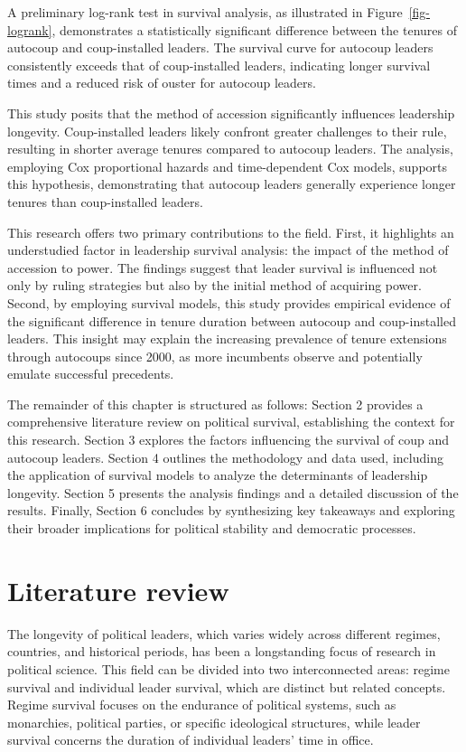 \documentclass[
  12pt,
]{report}
\begin{document}
A preliminary log-rank test in survival analysis, as illustrated in
Figure~\ref{fig-logrank}, demonstrates a statistically significant
difference between the tenures of autocoup and coup-installed leaders.
The survival curve for autocoup leaders consistently exceeds that of
coup-installed leaders, indicating longer survival times and a reduced
risk of ouster for autocoup leaders.

This study posits that the method of accession significantly influences
leadership longevity. Coup-installed leaders likely confront greater
challenges to their rule, resulting in shorter average tenures compared
to autocoup leaders. The analysis, employing Cox proportional hazards
and time-dependent Cox models, supports this hypothesis, demonstrating
that autocoup leaders generally experience longer tenures than
coup-installed leaders.

This research offers two primary contributions to the field. First, it
highlights an understudied factor in leadership survival analysis: the
impact of the method of accession to power. The findings suggest that
leader survival is influenced not only by ruling strategies but also by
the initial method of acquiring power. Second, by employing survival
models, this study provides empirical evidence of the significant
difference in tenure duration between autocoup and coup-installed
leaders. This insight may explain the increasing prevalence of tenure
extensions through autocoups since 2000, as more incumbents observe and
potentially emulate successful precedents.

The remainder of this chapter is structured as follows: Section 2
provides a comprehensive literature review on political survival,
establishing the context for this research. Section 3 explores the
factors influencing the survival of coup and autocoup leaders. Section 4
outlines the methodology and data used, including the application of
survival models to analyze the determinants of leadership longevity.
Section 5 presents the analysis findings and a detailed discussion of
the results. Finally, Section 6 concludes by synthesizing key takeaways
and exploring their broader implications for political stability and
democratic processes.

\section{Literature review}\label{literature-review}

The longevity of political leaders, which varies widely across different
regimes, countries, and historical periods, has been a longstanding
focus of research in political science. This field can be divided into
two interconnected areas: regime survival and individual leader
survival, which are distinct but related concepts. Regime survival
focuses on the endurance of political systems, such as monarchies,
political parties, or specific ideological structures, while leader
survival concerns the duration of individual leaders' time in office.
\end{document}
